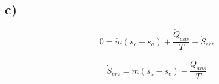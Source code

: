 

\subsection*{c)}

\begin{equation*}
0 = \dot{m}(s_e - s_a) + \frac{\dot{Q}_{aus}}{T} + \dot{S}_{erz}
\end{equation*}

\begin{equation*}
\dot{S}_{erz} = \dot{m}(s_a - s_e) - \frac{\dot{Q}_{aus}}{T}
\end{equation*}